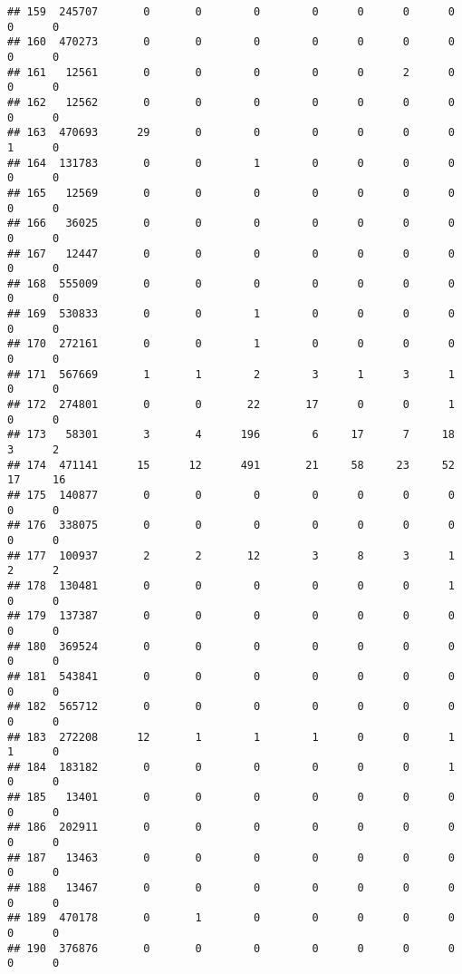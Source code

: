 \documentclass[
]{article}
\begin{document}
\begin{verbatim}
## 159  245707       0       0        0        0      0      0      0     0      0
## 160  470273       0       0        0        0      0      0      0     0      0
## 161   12561       0       0        0        0      0      2      0     0      0
## 162   12562       0       0        0        0      0      0      0     0      0
## 163  470693      29       0        0        0      0      0      0     1      0
## 164  131783       0       0        1        0      0      0      0     0      0
## 165   12569       0       0        0        0      0      0      0     0      0
## 166   36025       0       0        0        0      0      0      0     0      0
## 167   12447       0       0        0        0      0      0      0     0      0
## 168  555009       0       0        0        0      0      0      0     0      0
## 169  530833       0       0        1        0      0      0      0     0      0
## 170  272161       0       0        1        0      0      0      0     0      0
## 171  567669       1       1        2        3      1      3      1     0      0
## 172  274801       0       0       22       17      0      0      1     0      0
## 173   58301       3       4      196        6     17      7     18     3      2
## 174  471141      15      12      491       21     58     23     52    17     16
## 175  140877       0       0        0        0      0      0      0     0      0
## 176  338075       0       0        0        0      0      0      0     0      0
## 177  100937       2       2       12        3      8      3      1     2      2
## 178  130481       0       0        0        0      0      0      1     0      0
## 179  137387       0       0        0        0      0      0      0     0      0
## 180  369524       0       0        0        0      0      0      0     0      0
## 181  543841       0       0        0        0      0      0      0     0      0
## 182  565712       0       0        0        0      0      0      0     0      0
## 183  272208      12       1        1        1      0      0      1     1      0
## 184  183182       0       0        0        0      0      0      1     0      0
## 185   13401       0       0        0        0      0      0      0     0      0
## 186  202911       0       0        0        0      0      0      0     0      0
## 187   13463       0       0        0        0      0      0      0     0      0
## 188   13467       0       0        0        0      0      0      0     0      0
## 189  470178       0       1        0        0      0      0      0     0      0
## 190  376876       0       0        0        0      0      0      0     0      0

\end{verbatim}
\end{document}
